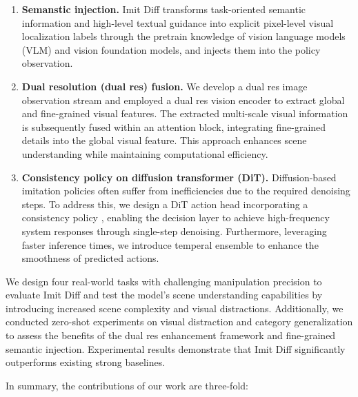 \begin{enumerate}

\item \textbf{Semanstic injection.} Imit Diff transforms task-oriented semantic information and high-level textual guidance into explicit pixel-level visual localization labels through the pretrain knowledge of vision language models (VLM) and vision foundation models, and injects them into the policy observation.

\item \textbf{Dual resolution (dual res) fusion.} We develop a dual res image observation stream and employed a dual res vision encoder to extract global and fine-grained visual features. The extracted multi-scale visual information is subsequently fused within an attention block, integrating fine-grained details into the global visual feature. This approach enhances scene understanding while maintaining computational efficiency.

\item \textbf{Consistency policy on diffusion transformer (DiT).} Diffusion-based imitation policies often suffer from inefficiencies due to the required denoising steps. To address this, we design a DiT \citep{peebles2023scalable} action head incorporating a consistency policy \citep{song2023consistency}, enabling the decision layer to achieve high-frequency system responses through single-step denoising. Furthermore, leveraging faster inference times, we introduce temperal ensemble to enhance the smoothness of predicted actions.

\end{enumerate}

We design four real-world tasks with challenging manipulation precision to evaluate Imit Diff and test the model's scene understanding capabilities by introducing increased scene complexity and visual distractions. Additionally, we conducted zero-shot experiments on visual distraction and category generalization to assess the benefits of the dual res enhancement framework and fine-grained semantic injection. Experimental results demonstrate that Imit Diff significantly outperforms existing strong baselines. 

In summary, the contributions of our work are three-fold:

